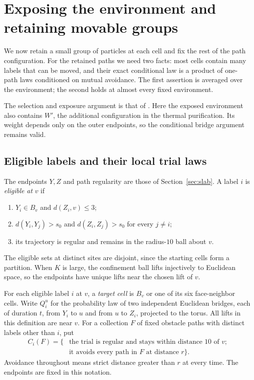 \section{Exposing the environment and retaining movable groups}
\label{sec:groups}

We now retain a small group of particles at each cell and fix the rest
of the path configuration.  For the retained paths we need two facts:
most cells contain many labels that can be moved, and their exact
conditional law is a product of one-path laws conditioned on mutual
avoidance.  The first assertion is averaged over the environment; the
second holds at almost every fixed environment.

The selection and exposure argument is that of \citet[Section~6]{HS}.
Here the exposed environment also contains $W'$, the additional
configuration in the thermal purification.  Its weight depends only on
the outer endpoints, so the conditional bridge argument remains valid.

\subsection{Eligible labels and their local trial laws}

The endpoints $Y,Z$ and path regularity are those of
Section~\ref{sec:slab}.  A label $i$ is \emph{eligible at $v$} if
\begin{enumerate}[label=\textup{(\roman*)}]
 \item $Y_i\in B_v$ and $d(Z_i,v)\le3$;
 \item $d(Y_i,Y_j)>s_0$ and $d(Z_i,Z_j)>s_0$ for every $j\ne i$;
 \item its trajectory is regular and remains in the radius-$10$ ball
 about $v$.
\end{enumerate}
The eligible sets at distinct sites are disjoint, since the starting
cells form a partition.  When $K$ is large, the confinement ball lifts
injectively to Euclidean space, so the endpoints have unique lifts
near the chosen lift of $v$.

For each eligible label $i$ at $v$, a \emph{target cell} is $B_v$ or
one of its six face-neighbor cells.  Write $Q_i^u$ for the probability
law of two independent Euclidean bridges, each of duration $t$, from
$Y_i$ to $u$ and from $u$ to $Z_i$, projected to the torus.  All lifts
in this definition are near $v$.  For a collection $F$ of fixed
obstacle paths with distinct labels other than $i$, put
\begin{equation}\label{group:success-event}
 \begin{split}
 C_i(F)=\{&\text{the trial is regular and stays within distance $10$ of $v$;}\\
          &\text{it avoids every path in $F$ at distance $r$}\}.
 \end{split}
\end{equation}
Avoidance throughout means strict distance greater than $r$ at every
time.  The endpoints are fixed in this notation.


